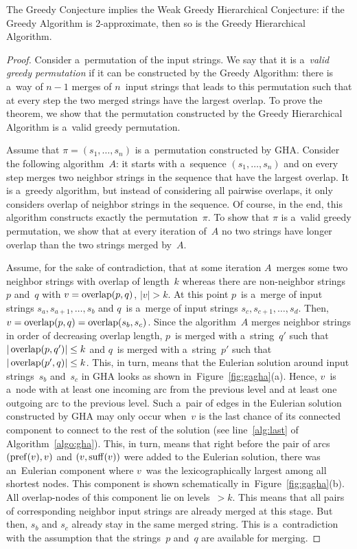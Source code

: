 \begin{theorem}
The Greedy Conjecture implies the Weak Greedy Hierarchical Conjecture: if the Greedy Algorithm is 2-approximate, then so is the Greedy Hierarchical Algorithm.
\end{theorem}
\begin{proof}
Consider a~permutation of the input strings. We say that it is a~{\em valid greedy permutation} if it can be constructed by the Greedy Algorithm: there is a~way of $n-1$ merges of $n$~input strings that leads to this permutation such that at every step the two merged strings have the largest overlap. To prove the theorem, we show that the permutation constructed by the Greedy Hierarchical Algorithm is a~valid greedy permutation.

Assume that $\pi=(s_1, \dots, s_n)$ is a~permutation constructed by GHA. Consider the following algorithm~$A$: it starts with a~sequence $(s_1, \dots, s_n)$ and on every step merges two neighbor strings in the sequence that have the largest overlap. It is a~greedy algorithm, but instead of considering all pairwise overlaps, it only considers overlap of neighbor strings in the sequence. Of course, in the end, this algorithm constructs exactly the permutation~$\pi$. To show that $\pi$ is a~valid greedy permutation, we show that at every iteration of~$A$ no two strings have longer overlap than the two strings merged by~$A$.

Assume, for the sake of contradiction, that at some iteration $A$~merges some two neighbor strings with overlap of length~$k$ whereas there are non-neighbor strings~$p$ and~$q$ with $v=\operatorname{overlap}(p,q)$, $|v|>k$. 
At this point $p$~is a~merge of input strings $s_a, s_{a+1}, \dotsc, s_b$
and $q$~is a~merge of input strings $s_c, s_{c+1}, \dotsc, s_d$. 
Then, $v=\operatorname{overlap}(p,q)=\operatorname{overlap}(s_b,s_c)$. Since the algorithm~$A$
merges neighbor strings in order of decreasing overlap length, $p$~is merged with a~string~$q'$ such that $|\operatorname{overlap}(p,q')| \le k$ and $q$~is merged with a~string~$p'$ such that $|\operatorname{overlap}(p',q)| \le k$. This, in turn, means that the Eulerian solution around input strings~$s_b$ and~$s_c$ in GHA looks as shown in~Figure~\ref{fig:gagha}(a). Hence, $v$~is a~node with at least one incoming arc from the previous level and at least one outgoing arc to the previous level. Such a~pair of edges in the Eulerian solution constructed by GHA may only occur when~$v$ is the last chance of
its connected component to connect to the rest of the solution (see line~\ref{alg:last} of Algorithm~\ref{algo:gha}). This, in turn, means that right before the pair of arcs $(\operatorname{pref}(v), v)$ and $(v, \operatorname{suff}(v))$ were added to the Eulerian solution, there was an~Eulerian component where $v$~was the lexicographically largest among all shortest nodes. This component is shown schematically in~Figure~\ref{fig:gagha}(b). All overlap-nodes of this component lie on levels~$>k$. This means that all pairs of corresponding neighbor input strings are already merged at this stage. But then, $s_b$ and
$s_c$ already stay in the same merged string. This is a~contradiction with the assumption that the strings~$p$ and~$q$ are available for merging.


\end{proof}
